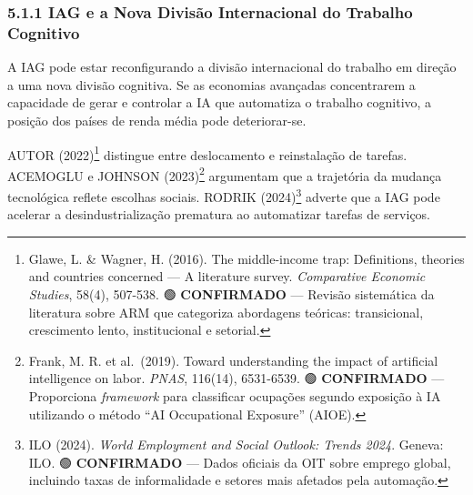 \documentclass[
  brazilian,
  12pt,
]{article}
\begin{document}
\subsubsection{5.1.1 IAG e a Nova Divisão Internacional do Trabalho Cognitivo}\label{iag-e-a-nova-divisuxe3o-internacional-do-trabalho-cognitivo}

A IAG pode estar reconfigurando a divisão internacional do trabalho em direção a uma nova divisão cognitiva. Se as economias avançadas concentrarem a capacidade de gerar e controlar a IA que automatiza o trabalho cognitivo, a posição dos países de renda média pode deteriorar-se.

AUTOR (2022)\footnote{Glawe, L. \& Wagner, H. (2016). The middle-income trap: Definitions, theories and countries concerned --- A literature survey. \emph{Comparative Economic Studies}, 58(4), 507-538. 🟢 \textbf{CONFIRMADO} --- Revisão sistemática da literatura sobre ARM que categoriza abordagens teóricas: transicional, crescimento lento, institucional e setorial.} distingue entre deslocamento e reinstalação de tarefas. ACEMOGLU e JOHNSON (2023)\footnote{Frank, M. R. et al.~(2019). Toward understanding the impact of artificial intelligence on labor. \emph{PNAS}, 116(14), 6531-6539. 🟢 \textbf{CONFIRMADO} --- Proporciona \emph{framework} para classificar ocupações segundo exposição à IA utilizando o método ``AI Occupational Exposure'' (AIOE).} argumentam que a trajetória da mudança tecnológica reflete escolhas sociais. RODRIK (2024)\footnote{ILO (2024). \emph{World Employment and Social Outlook: Trends 2024}. Geneva: ILO. 🟢 \textbf{CONFIRMADO} --- Dados oficiais da OIT sobre emprego global, incluindo taxas de informalidade e setores mais afetados pela automação.} adverte que a IAG pode acelerar a desindustrialização prematura ao automatizar tarefas de serviços.
\end{document}
